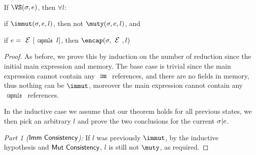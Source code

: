 \SS\begin{theorem}\ \\	
	\indent If $\VS(\s,e)$, then $\forall l$:
	\begin{ienumerate}
		\item if $\immut(\s,e,l)$, then not $\muty(\s,e,l)$, and
		\item if $e = \E[\Kw{capsule}\,l]$, then $\encap(\s,\E,l)$
	\end{ienumerate}
\end{theorem}
\SS\begin{proof}
	\REFORMAT
	As before, we prove this by induction on the number of reduction since
	the initial main expression and memory. The base case is trivial since
	the main expression cannot contain any $\Kw{imm}$ references, and there
	are no fields in memory, thus nothing can be $\immut$, moreover the
	main expression cannot contain any $\Kw{capsule}$ references.
	
	In the inductive case we assume that our theorem holds for all previous
	states, we then pick an arbitrary $l$ and prove the two conclusions
	for the current $\sigma|e$.
	
	\emph{Part 1 ($\textsf{Imm Consistency}$): }If $l$ was previously $\immut$, by the inductive hypothesis and
	$\textsf{Mut Consistency}$, $l$ is still not $\muty$, as required.
	

\end{proof}
